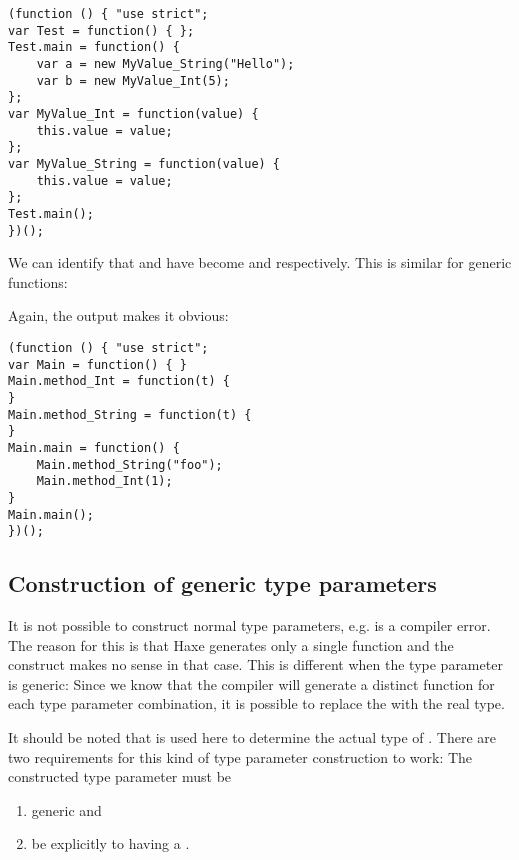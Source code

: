 \begin{lstlisting}
(function () { "use strict";
var Test = function() { };
Test.main = function() {
	var a = new MyValue_String("Hello");
	var b = new MyValue_Int(5);
};
var MyValue_Int = function(value) {
	this.value = value;
};
var MyValue_String = function(value) {
	this.value = value;
};
Test.main();
})();
\end{lstlisting}

We can identify that  and  have become  and  respectively. This is similar for generic functions:


Again, the  output makes it obvious:

\begin{lstlisting}
(function () { "use strict";
var Main = function() { }
Main.method_Int = function(t) {
}
Main.method_String = function(t) {
}
Main.main = function() {
	Main.method_String("foo");
	Main.method_Int(1);
}
Main.main();
})();
\end{lstlisting}


\subsection{Construction of generic type parameters}
\label{type-system-generic-type-parameter-construction}


It is not possible to construct normal type parameters, e.g.  is a compiler error. The reason for this is that Haxe generates only a single function and the construct makes no sense in that case. This is different when the type parameter is generic: Since we know that the compiler will generate a distinct function for each type parameter combination, it is possible to replace the   with the real type.


It should be noted that  is used here to determine the actual type of . There are two requirements for this kind of type parameter construction to work: The constructed type parameter must be

\begin{enumerate}
	\item generic and
	\item be explicitly  to having a .
\end{enumerate}

